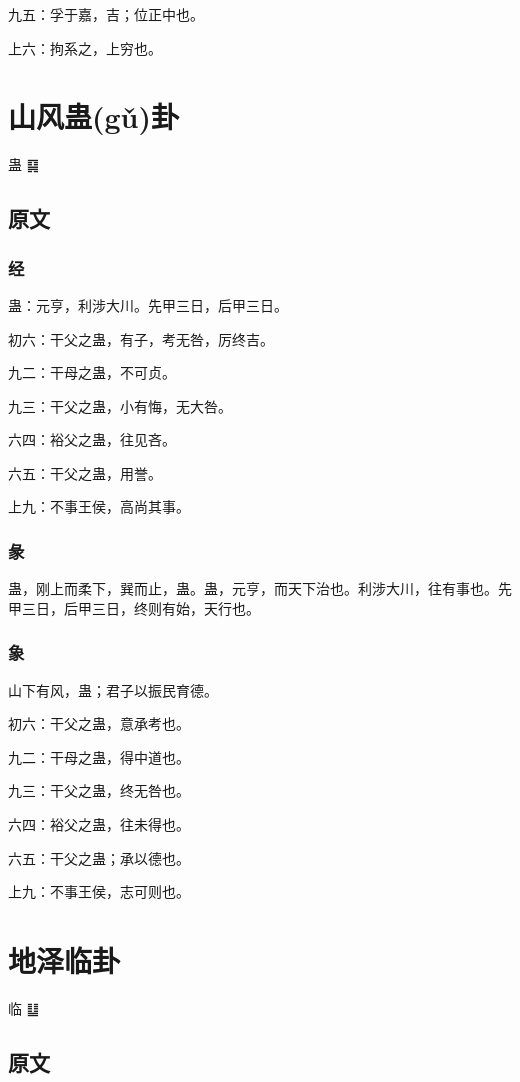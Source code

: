 \documentclass[12pt,oneside]{book}
\begin{document}
九五：孚于嘉，吉；位正中也。

上六：拘系之，上穷也。

\chapter{山风蛊(gǔ)卦}
蛊 {\Large ䷑}

\section{原文}

\subsection{经}
蛊：元亨，利涉大川。先甲三日，后甲三日。

初六：干父之蛊，有子，考无咎，厉终吉。

九二：干母之蛊，不可贞。

九三：干父之蛊，小有悔，无大咎。

六四：裕父之蛊，往见吝。

六五：干父之蛊，用誉。

上九：不事王侯，高尚其事。

\subsection{彖}
蛊，刚上而柔下，巽而止，蛊。蛊，元亨，而天下治也。利涉大川，往有事也。先甲三日，后甲三日，终则有始，天行也。

\subsection{象}
山下有风，蛊；君子以振民育德。

初六：干父之蛊，意承考也。

九二：干母之蛊，得中道也。

九三：干父之蛊，终无咎也。

六四：裕父之蛊，往未得也。

六五：干父之蛊；承以德也。

上九：不事王侯，志可则也。

\chapter{地泽临卦}
临 {\Large ䷒}

\section{原文}
\end{document}

